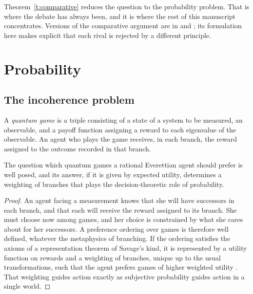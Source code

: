 \documentclass{situationist-preprint}
\begin{document}
Theorem~\ref{t:comparative} reduces the question to the probability problem. That is where the debate has always been, and it is where the rest of this manuscript concentrates. Versions of the comparative argument are in \citet{Wallace2012} and \citet{BrownWallace2005}; its formulation here makes explicit that each rival is rejected by a different principle.

\section{Probability}\label{s:prob}

\subsection{The incoherence problem}

\begin{definition}\label{d:game}
A \emph{quantum game} is a triple consisting of a state of a system to be measured, an observable, and a payoff function assigning a reward to each eigenvalue of the observable. An agent who plays the game receives, in each branch, the reward assigned to the outcome recorded in that branch.
\end{definition}

\begin{proposition}[Coherence]\label{p:coherence}
The question which quantum games a rational Everettian agent should prefer is well posed, and its answer, if it is given by expected utility, determines a weighting of branches that plays the decision-theoretic role of probability.
\end{proposition}

\begin{proof}
An agent facing a measurement knows that she will have successors in each branch, and that each will receive the reward assigned to its branch. She must choose now among games, and her choice is constrained by what she cares about for her successors. A preference ordering over games is therefore well defined, whatever the metaphysics of branching. If the ordering satisfies the axioms of a representation theorem of Savage's kind, it is represented by a utility function on rewards and a weighting of branches, unique up to the usual transformations, such that the agent prefers games of higher weighted utility \citep{Savage1954,Wallace2012}. That weighting guides action exactly as subjective probability guides action in a single world.
\end{proof}
\end{document}
